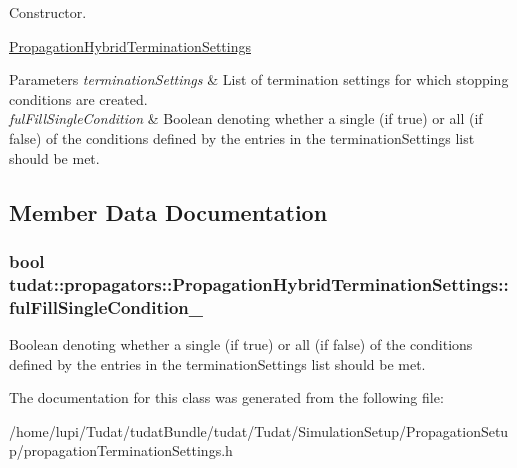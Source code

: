 Constructor. 

\hyperlink{classtudat_1_1propagators_1_1PropagationHybridTerminationSettings}{Propagation\+Hybrid\+Termination\+Settings} 
\begin{DoxyParams}{Parameters}
{\em termination\+Settings} & List of termination settings for which stopping conditions are created. \\
\hline
{\em ful\+Fill\+Single\+Condition} & Boolean denoting whether a single (if true) or all (if false) of the conditions defined by the entries in the termination\+Settings list should be met. \\
\hline
\end{DoxyParams}


\subsection{Member Data Documentation}
\subsubsection[{\texorpdfstring{ful\+Fill\+Single\+Condition\+\_\+}{fulFillSingleCondition_}}]{\setlength{\rightskip}{0pt plus 5cm}bool tudat\+::propagators\+::\+Propagation\+Hybrid\+Termination\+Settings\+::ful\+Fill\+Single\+Condition\+\_\+}\hypertarget{classtudat_1_1propagators_1_1PropagationHybridTerminationSettings_ac73dee77fd30cb5b6adbc1e429de573c}{}\label{classtudat_1_1propagators_1_1PropagationHybridTerminationSettings_ac73dee77fd30cb5b6adbc1e429de573c}
Boolean denoting whether a single (if true) or all (if false) of the conditions defined by the entries in the termination\+Settings list should be met. 

The documentation for this class was generated from the following file\+:\begin{DoxyCompactItemize}
\item 
/home/lupi/\+Tudat/tudat\+Bundle/tudat/\+Tudat/\+Simulation\+Setup/\+Propagation\+Setup/propagation\+Termination\+Settings.\+h\end{DoxyCompactItemize}
